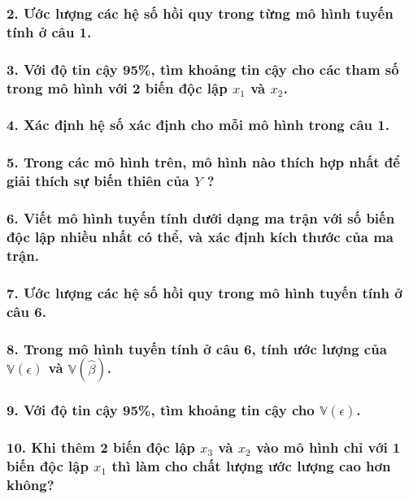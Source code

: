 \documentclass[a4paper]{article}
\theoremstyle{nonumberplain}
\begin{document}
\subsubsection*{2. Ước lượng các hệ số hồi quy trong từng mô hình tuyến tính ở câu 1.}


\subsubsection*{3. Với độ tin cậy 95\%, tìm khoảng tin cậy cho các tham số trong mô hình với 2 biến độc lập $x_1$ và $x_2$.}


\subsubsection*{4. Xác định hệ số xác định cho mỗi mô hình trong câu 1.}


\subsubsection*{5. Trong các mô hình trên, mô hình nào thích hợp nhất để giải thích sự biến thiên của $Y$ ?}


\subsubsection*{6. Viết mô hình tuyến tính dưới dạng ma trận với số biến độc lập nhiều nhất có thể, và xác định kích thước của ma trận.}


\subsubsection*{7. Ước lượng các hệ số hồi quy trong mô hình tuyến tính ở câu 6.}


\subsubsection*{8. Trong mô hình tuyến tính ở câu 6, tính ước lượng của $\mathbb{V}(\epsilon)$ và $\mathbb{V}(\hat{\beta})$.}


\subsubsection*{9. Với độ tin cậy 95\%, tìm khoảng tin cậy cho $\mathbb{V}(\epsilon)$. }


\subsubsection*{10. Khi thêm 2 biến độc lập $x_3$ và $x_2$ vào mô hình chỉ với 1 biến độc lập $x_1$ thì làm cho chất
lượng ước lượng cao hơn không?}
\end{document}
